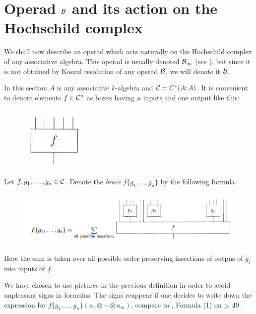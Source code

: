 \documentclass[TFM.tex]{subfiles}
\begin{document}

\section{Operad $\mathcal{B}$ and its action on the Hochschild complex}
We shall now describe an operad which
acts naturally on the Hochschild complex of any associative algebra. This operad is
usually denoted $\mathcal{B}_\infty$ (see \cite{Hinich}), but since it is not obtained by Koszul resolution of any operad $\mathcal{B}$, we will denote it $\mathcal{B}$. 

In this section $A$ is any associative $k$-algebra and $\mathcal{C}=C^*(A;A)$.
It is convenient to denote elements $f \in \mathcal{C}^n$ as boxes having $n$ inputs and one output like
this:

\begin{figure}[h!]
\includegraphics[scale=0.9]{Imagenes//box}
\end{figure}


\begin{defi}
Let $f,g_1,\dots, g_n\in \mathcal{C}$. Denote the \emph{brace} $f\{g_1,\dots, g_n\}$ by the following formula.

\begin{figure}[h!]
\includegraphics[scale=0.7]{Imagenes//brace}
\end{figure}

Here the sum is taken over all possible order preserving insertions of outpus of $g_i$ into
inputs of $f$.
\end{defi}

\begin{remark}
We have chosen to use pictures in the previous definition in order to avoid unpleasant
signs in formulas. The signs reappear if one decides to write down the expression for
$f\{g_1,\dots, g_n\}(a_1\otimes \cdots \otimes a_m)$, compare to \cite{GJHinich}, Formula (1) on p. 49.
\end{remark}
\end{document}
